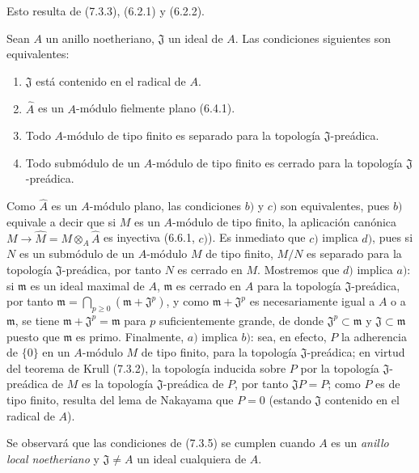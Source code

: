 Esto resulta de (7.3.3), (6.2.1) y (6.2.2).

\begin{corollary}[7.3.5]
\label{0.7.3.5-fr}
Sean $A$ un anillo noetheriano, $\mathfrak J$ un ideal de $A$. Las
condiciones siguientes son equivalentes:
\begin{enumerate}
  \item[$a)$] $\mathfrak J$ está contenido en el radical de $A$.
  \item[$b)$] $\widehat A$ es un $A$-módulo fielmente plano \textup{(6.4.1)}.
  \item[$c)$] Todo $A$-módulo de tipo finito es separado para la topología
  $\mathfrak J$-preádica.
  \item[$d)$] Todo submódulo de un $A$-módulo de tipo finito es cerrado para la
  topología $\mathfrak J$-preádica.
\end{enumerate}
\end{corollary}

Como $\widehat A$ es un $A$-módulo plano, las condiciones $b)$ y $c)$ son
equivalentes, pues $b)$ equivale a decir que si $M$ es un $A$-módulo de tipo
finito, la aplicación canónica
$M\to\widehat M=M\otimes_A\widehat A$ es inyectiva (6.6.1, $c)$). Es
inmediato que $c)$ implica $d)$, pues si $N$ es un submódulo de un $A$-módulo
$M$ de tipo finito, $M/N$ es separado para la topología $\mathfrak J$-preádica,
por tanto $N$ es cerrado en $M$. Mostremos que $d)$ implica $a)$: si
$\mathfrak m$ es un ideal maximal de $A$, $\mathfrak m$ es cerrado en $A$
para la topología $\mathfrak J$-preádica, por tanto $\mathfrak m=\bigcap_{p\geq0}(\mathfrak m+\mathfrak J^p)$,
y como $\mathfrak m+\mathfrak J^p$ es necesariamente igual a $A$ o a
$\mathfrak m$, se tiene $\mathfrak m+\mathfrak J^p=\mathfrak m$ para $p$ suficientemente
grande, de donde $\mathfrak J^p\subset\mathfrak m$ y
$\mathfrak J\subset\mathfrak m$ puesto que $\mathfrak m$ es primo. Finalmente,
$a)$ implica $b)$: sea, en efecto, $P$ la adherencia de $\{0\}$ en un
$A$-módulo $M$ de tipo finito, para la topología $\mathfrak J$-preádica; en
virtud del teorema de Krull (7.3.2), la topología inducida sobre $P$ por la topología
$\mathfrak J$-preádica de $M$ es la topología $\mathfrak J$-preádica de
$P$, por tanto $\mathfrak JP=P$; como $P$ es de tipo finito, resulta del lema
de Nakayama que $P=0$ (estando $\mathfrak J$ contenido en el radical de $A$).

Se observará que las condiciones de (7.3.5) se cumplen cuando $A$ es un
\emph{anillo local noetheriano} y $\mathfrak J\neq A$ un ideal cualquiera de
$A$.

